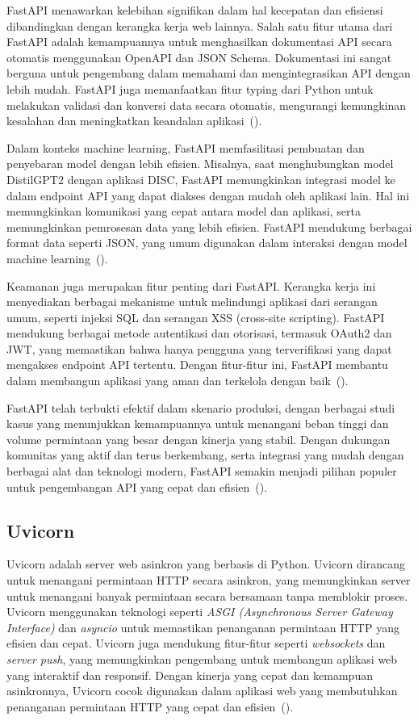 FastAPI menawarkan kelebihan signifikan dalam hal kecepatan dan efisiensi dibandingkan dengan kerangka kerja web lainnya. Salah satu fitur utama dari FastAPI adalah kemampuannya untuk menghasilkan dokumentasi API secara otomatis menggunakan OpenAPI dan JSON Schema. Dokumentasi ini sangat berguna untuk pengembang dalam memahami dan mengintegrasikan API dengan lebih mudah. FastAPI juga memanfaatkan fitur typing dari Python untuk melakukan validasi dan konversi data secara otomatis, mengurangi kemungkinan kesalahan dan meningkatkan keandalan aplikasi~(\cite{fastapi}).

Dalam konteks machine learning, FastAPI memfasilitasi pembuatan dan penyebaran model dengan lebih efisien. Misalnya, saat menghubungkan model DistilGPT2 dengan aplikasi DISC, FastAPI memungkinkan integrasi model ke dalam endpoint API yang dapat diakses dengan mudah oleh aplikasi lain. Hal ini memungkinkan komunikasi yang cepat antara model dan aplikasi, serta memungkinkan pemrosesan data yang lebih efisien. FastAPI mendukung berbagai format data seperti JSON, yang umum digunakan dalam interaksi dengan model machine learning~(\cite{ariful2021}).

Keamanan juga merupakan fitur penting dari FastAPI. Kerangka kerja ini menyediakan berbagai mekanisme untuk melindungi aplikasi dari serangan umum, seperti injeksi SQL dan serangan XSS (cross-site scripting). FastAPI mendukung berbagai metode autentikasi dan otorisasi, termasuk OAuth2 dan JWT, yang memastikan bahwa hanya pengguna yang terverifikasi yang dapat mengakses endpoint API tertentu. Dengan fitur-fitur ini, FastAPI membantu dalam membangun aplikasi yang aman dan terkelola dengan baik~(\cite{bansal2022}).

FastAPI telah terbukti efektif dalam skenario produksi, dengan berbagai studi kasus yang menunjukkan kemampuannya untuk menangani beban tinggi dan volume permintaan yang besar dengan kinerja yang stabil. Dengan dukungan komunitas yang aktif dan terus berkembang, serta integrasi yang mudah dengan berbagai alat dan teknologi modern, FastAPI semakin menjadi pilihan populer untuk pengembangan API yang cepat dan efisien~(\cite{fastapi}).

\subsection{Uvicorn}

Uvicorn adalah server web asinkron yang berbasis di Python.
Uvicorn dirancang untuk menangani permintaan HTTP secara
asinkron, yang memungkinkan server untuk menangani banyak
permintaan secara bersamaan tanpa memblokir proses. Uvicorn
menggunakan teknologi seperti \emph{ASGI (Asynchronous Server
Gateway Interface)} dan \emph{asyncio} untuk memastikan
penanganan permintaan HTTP yang efisien dan cepat. Uvicorn
juga mendukung fitur-fitur seperti \emph{websockets} dan
\emph{server push}, yang memungkinkan pengembang untuk
membangun aplikasi web yang interaktif dan responsif.
Dengan kinerja yang cepat dan kemampuan asinkronnya, Uvicorn
cocok digunakan dalam aplikasi web yang membutuhkan
penanganan permintaan HTTP yang cepat dan efisien~(\cite{uvicorn}).

